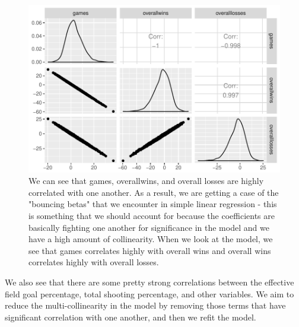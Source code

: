 \documentclass[10pt,a4paper, hidelinks]{article} %
\begin{document}
\begin{figure}[H]
	\centering
	\includegraphics[width=0.7\linewidth]{../fig/polr_correlation}
	\caption{We can see that games, overallwins, and overall losses are highly correlated with one another. As a result, we are getting a case of the "bouncing betas" that we encounter in simple linear regression - this is something that we should account for because the coefficients are basically fighting one another for significance in the model and we have a high amount of collinearity. When we look at the model, we see that games correlates highly with overall wins and overall wins correlates highly with overall losses.}
	\label{fig:polrcorrelation}
\end{figure}

We also see that there are some pretty strong correlations between the effective field goal percentage, total shooting percentage, and other variables. We aim to reduce the multi-collinearity in the model by removing those terms that have significant correlation with one another, and then we refit the model. 
\end{document}

